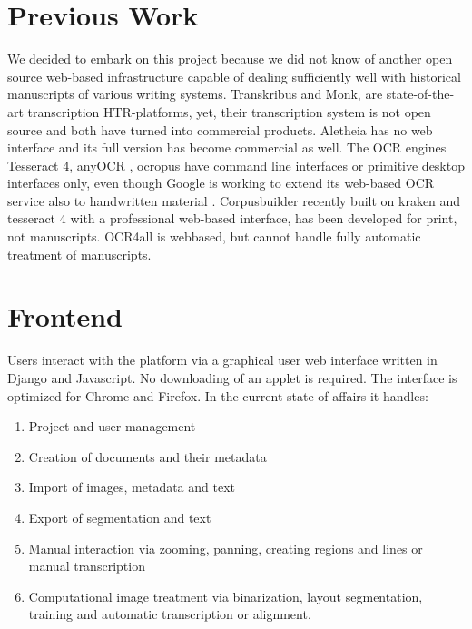 \section{Previous Work}

We decided to embark on this project because we did not know of another open
source web-based infrastructure capable of dealing sufficiently well with
historical manuscripts of various writing systems. Transkribus\cite{Kahle} and
Monk\cite{monk}, \cite{schomaker2016design} are state-of-the-art transcription
HTR-platforms, yet, their transcription system is not open source and both have
turned into commercial
products. Aletheia \cite{aletheia,6065274} has no web interface and its full version has
become commercial as well. The OCR engines Tesseract 4\cite{tesseract4}, anyOCR
\cite{bukhari2017anyocr}, ocropus \cite{ocropy,ocropy3} have command line
interfaces or primitive desktop interfaces only,
even though Google is working to extend its web-based OCR service also to
handwritten material \cite{walker2018web,ingle2019scalable}.
Corpusbuilder\cite{corpusbuilder} recently built on kraken and tesseract 4 with
a professional web-based interface, has been developed for print, not
manuscripts. OCR4all\cite{reul2019ocr4all} is webbased, but cannot handle fully
automatic treatment of manuscripts.

\section{Frontend}

Users interact with the platform via a graphical user web interface written in
Django and Javascript. No downloading of an applet is required. The interface
is optimized for Chrome and Firefox. In the current state of affairs it
handles:

\begin{enumerate}
\item Project and user management
\item Creation of documents and their metadata
\item Import of images, metadata and text
\item Export of segmentation and text
\item Manual interaction via zooming, panning, creating regions and lines or manual transcription
\item Computational image treatment via binarization, layout segmentation, training and automatic transcription or alignment.
\end{enumerate}

